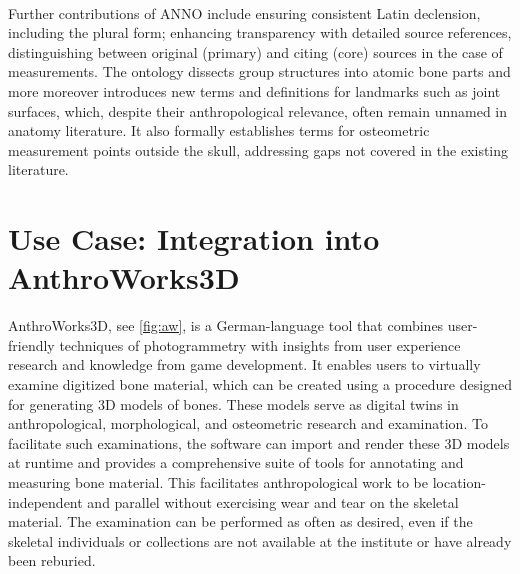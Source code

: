 \documentclass[sw]{iosart2x}
\newcommand{\aw}{AnthroWorks3D}
\begin{document}
\paragraph{}

Further contributions of ANNO include ensuring consistent Latin declension, including the plural form; enhancing transparency with detailed source references, distinguishing between original (primary) and citing (core) sources in the case of measurements.
The ontology dissects group structures into atomic bone parts and more moreover introduces new terms and definitions for landmarks such as joint surfaces, which, despite their anthropological relevance, often remain unnamed in anatomy literature.
It also formally establishes terms for osteometric measurement points outside the skull, addressing gaps not covered in the existing literature.

\section{Use Case: Integration into \aw{}}\label{sec:aw}

\aw{}, see \cref{fig:aw}, is a German-language tool that combines user-friendly techniques of photogrammetry with insights from user experience research and knowledge from game development.
It enables users to virtually examine digitized bone material, which can be created using a procedure designed for generating 3D models of bones.
These models serve as digital twins in anthropological, morphological, and osteometric research and examination.
To facilitate such examinations, the software can import and render these 3D models at runtime and provides a comprehensive suite of tools for annotating and measuring bone material.
This facilitates anthropological work to be location-independent and parallel without exercising wear and tear on the skeletal material.
The examination can be performed as often as desired, even if the skeletal individuals or collections are not available at the institute or have already been reburied.
\end{document}
